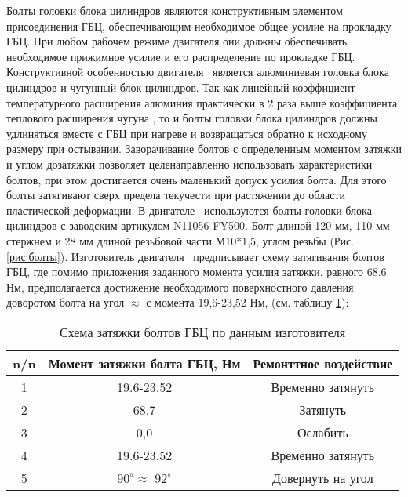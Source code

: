 Болты головки блока цилиндров являются конструктивным элементом присоединения ГБЦ, обеспечивающим необходимое общее усилие на прокладку ГБЦ. При любом рабочем режиме двигателя они должны обеспечивать необходимое прижимное усилие и его распределение по прокладке ГБЦ. Конструктивной особенностью двигателя \, является алюминиевая головка блока цилиндров и  чугунный блок цилиндров. Так как линейный коэффициент температурного расширения алюминия практически  в 2 раза выше коэффициента теплового расширения чугуна ,  то и болты головки блока цилиндров должны удлиняться вместе с ГБЦ при нагреве и возвращаться обратно к исходному размеру при остывании.  Заворачивание болтов с определенным моментом затяжки и углом дозатяжки позволяет целенаправленно использовать характеристики болтов, при этом достигается очень маленький допуск усилия болта.  Для этого болты затягивают сверх предела текучести при растяжении до области пластической деформации. В двигателе \, используются болты головки блока цилиндров с заводским артикулом  N11056-FY500.  Болт длиной 120 мм, 110 мм стержнем и 28 мм длиной резьбовой части М10*1,5, углом резьбы  (Рис. \ref{рис:болты}).
Изготовитель двигателя \, предписывает схему затягивания болтов ГБЦ, где помимо  приложения заданного момента усилия затяжки, равного 68.6 Нм, предполагается  достижение необходимого поверхностного давления  доворотом болта на угол    $ \approx  $  с момента 19,6-23,52 Нм, (см. таблицу \ref{схемазатяжки}):
\vspace{2.5mm}
\begin{center}
\begin{table}[H]
           {\small \begin{tabular}{c|c|c}
            \hline
            \textbf{n/n } & {\textbf{Момент затяжки болта ГБЦ, Нм}} & \textbf{Ремонттное воздействие} \\
            \hline
            1 & 19.6-23.52 & Временно затянуть \\
            \hline
            2 & 68.7 & Затянуть \\
            \hline
            3 & 0,0 & Ослабить \\
            \hline
            4 & 19.6-23.52 & Временно затянуть \\
            \hline
            5 & $90^{\circ}$$  \approx $ $92^{\circ}$ & Довернуть на угол \\
            \hline
    \end{tabular}}
    \caption{Схема затяжки болтов ГБЦ по данным изготовителя}
    \label{схемазатяжки}
\end{table}
\end{center}

